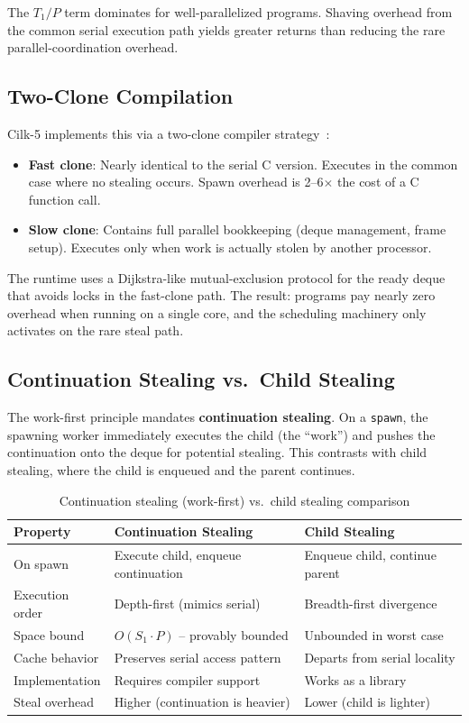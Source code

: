 \documentclass[11pt,letterpaper]{article}
\begin{document}
The $T_1/P$ term dominates for well-parallelized programs. Shaving overhead from the common serial execution path yields greater returns than reducing the rare parallel-coordination overhead.

\subsection{Two-Clone Compilation}

Cilk-5 implements this via a two-clone compiler strategy~\cite{frigo1998cilk5}:

\begin{itemize}
    \item \textbf{Fast clone}: Nearly identical to the serial C version. Executes in the common case where no stealing occurs. Spawn overhead is 2--6$\times$ the cost of a C function call.
    \item \textbf{Slow clone}: Contains full parallel bookkeeping (deque management, frame setup). Executes only when work is actually stolen by another processor.
\end{itemize}

The runtime uses a Dijkstra-like mutual-exclusion protocol for the ready deque that avoids locks in the fast-clone path. The result: programs pay nearly zero overhead when running on a single core, and the scheduling machinery only activates on the rare steal path.

\subsection{Continuation Stealing vs.\ Child Stealing}

The work-first principle mandates \textbf{continuation stealing}. On a \texttt{spawn}, the spawning worker immediately executes the child (the ``work'') and pushes the continuation onto the deque for potential stealing. This contrasts with child stealing, where the child is enqueued and the parent continues.

\begin{table}[htbp]
\centering
\caption{Continuation stealing (work-first) vs.\ child stealing comparison}
\label{tab:stealing}
\begin{tabular}{@{}lll@{}}
\toprule
\textbf{Property} & \textbf{Continuation Stealing} & \textbf{Child Stealing} \\
\midrule
On spawn & Execute child, enqueue continuation & Enqueue child, continue parent \\
Execution order & Depth-first (mimics serial) & Breadth-first divergence \\
Space bound & $O(S_1 \cdot P)$ -- provably bounded & Unbounded in worst case \\
Cache behavior & Preserves serial access pattern & Departs from serial locality \\
Implementation & Requires compiler support & Works as a library \\
Steal overhead & Higher (continuation is heavier) & Lower (child is lighter) \\
\bottomrule
\end{tabular}
\end{table}
\end{document}
